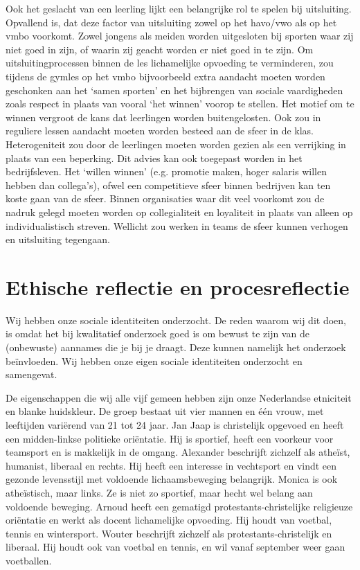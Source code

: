 \documentclass[a4paper,12pt]{memoir}
\begin{document}
Ook het geslacht van een leerling lijkt een belangrijke rol te spelen bij uitsluiting. Opvallend is, dat deze factor van uitsluiting zowel op het havo/vwo als op het vmbo voorkomt. Zowel jongens als meiden worden uitgesloten bij sporten waar zij niet goed in zijn, of waarin zij geacht worden er niet goed in te zijn. Om uitsluitingprocessen binnen de les lichamelijke opvoeding te verminderen, zou tijdens de gymles op het vmbo bijvoorbeeld extra aandacht moeten worden geschonken aan het `samen sporten' en het bijbrengen van sociale vaardigheden zoals respect in plaats van vooral `het winnen' voorop te stellen. Het motief om te winnen vergroot de kans dat leerlingen worden buitengelosten. Ook zou in reguliere lessen aandacht moeten worden besteed aan de sfeer in de klas. Heterogeniteit zou door de leerlingen moeten worden gezien als een verrijking in plaats van een beperking. Dit advies kan ook toegepast worden in het bedrijfsleven. Het `willen winnen' (e.g. promotie maken, hoger salaris willen hebben dan collega's), ofwel een competitieve sfeer binnen bedrijven kan ten koste gaan van de sfeer. Binnen organisaties waar dit veel voorkomt zou de nadruk gelegd moeten worden op collegialiteit en loyaliteit in plaats van alleen op individualistisch streven. Wellicht zou werken in teams de sfeer kunnen verhogen en uitsluiting tegengaan.

\appendix

\chapter{Ethische reflectie en procesreflectie}

Wij hebben onze sociale identiteiten onderzocht. De reden waarom wij dit doen, is omdat het bij kwalitatief onderzoek goed is om bewust te zijn van de (onbewuste) aannames die je bij je draagt. Deze kunnen namelijk het onderzoek beïnvloeden. Wij hebben onze eigen sociale identiteiten onderzocht en samengevat.

De eigenschappen die wij alle vijf gemeen hebben zijn onze Nederlandse etniciteit en blanke huidskleur. De groep bestaat uit vier mannen en één vrouw, met leeftijden variërend van 21 tot 24 jaar. Jan Jaap is christelijk opgevoed en heeft een midden-linkse politieke oriëntatie. Hij is sportief, heeft een voorkeur voor teamsport en is makkelijk in de omgang. Alexander beschrijft zichzelf als atheïst, humanist, liberaal en rechts. Hij heeft een interesse in vechtsport en vindt een gezonde levensstijl met voldoende lichaamsbeweging belangrijk. Monica is ook atheïstisch, maar links. Ze is niet zo sportief, maar hecht wel belang aan voldoende beweging. Arnoud heeft een gematigd protestants-christelijke religieuze oriëntatie en werkt als docent lichamelijke opvoeding. Hij houdt van voetbal, tennis en wintersport. Wouter beschrijft zichzelf als protestants-christelijk en liberaal. Hij houdt ook van voetbal en tennis, en wil vanaf september weer gaan voetballen.
\end{document}
